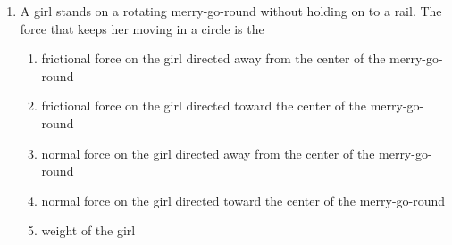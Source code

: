 \documentclass{../../../oss-classkick}
\begin{document}
\genheader


\genmultidirections

\gengravity

\raggedcolumns
\begin{multicols*}{2}
  \begin{enumerate}[leftmargin=18pt]
  \item A girl stands on a rotating merry-go-round without holding on to a rail.
    The force that keeps her moving in a circle is the
    \begin{enumerate}[nosep,leftmargin=18pt,label=(\Alph*)]
    \item frictional force on the girl directed away from the center of the
      merry-go-round
    \item frictional force on the girl directed toward the center of the
      merry-go-round
    \item normal force on the girl directed away from the center of the
      merry-go-round
    \item normal force on the girl directed toward the center of the
      merry-go-round
    \item weight of the girl
    \end{enumerate}
    \vspace{.7in}
    
  \end{enumerate}
  

\end{multicols*}
\end{document}
